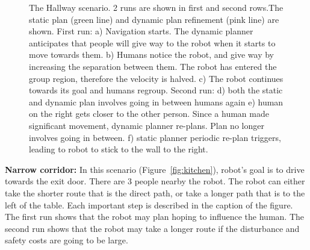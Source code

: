 \documentclass[12pt]{gatech-thesis}
\begin{document}
\begin{figure}[ht!]
{        }
    \caption{%
	The Hallway scenario. 2 runs are shown in first and second rows.The static plan (green line) and dynamic plan refinement (pink line) are shown. First run: a) Navigation starts. The dynamic planner anticipates that people will give way to the robot when it starts to move towards them. b) Humans notice the robot, and give way by increasing the separation between them. The robot has entered the group region, therefore the velocity is halved. c) The robot continues towards its goal and humans regroup. Second run: d) both the static and dynamic plan involves going in between humans again e) human on the right gets closer to the other person. Since a human made significant movement, dynamic planner re-plans. Plan no longer involves going in between. f) static planner periodic re-plan triggers, leading to robot to stick to the wall to the right.
     }%
   \label{fig:corridor}
\end{figure}

\textbf{Narrow corridor:} In this scenario (Figure~\ref{fig:kitchen}), robot's goal is to drive towards the exit door. There are 3 people nearby the robot. The robot can either take the shorter route that is the direct path, or take a longer path that is to the left of the table. Each important step is described in the caption of the figure. The first run shows that the robot may plan hoping to influence the human. The second run shows that the robot may take a longer route if the disturbance and safety costs are going to be large.
\end{document}
